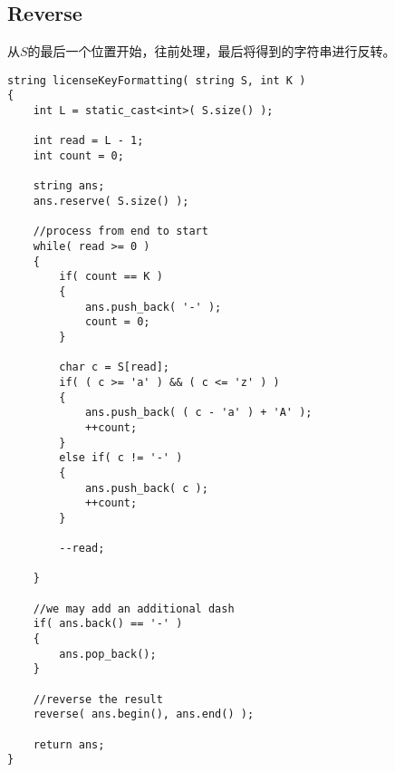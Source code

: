 \subsection{Reverse}
从$S$的最后一个位置开始，往前处理，最后将得到的字符串进行反转。

\setcounter{lstlisting}{0}
\begin{lstlisting}[style=customc, caption={Reverse}]
string licenseKeyFormatting( string S, int K )
{
    int L = static_cast<int>( S.size() );

    int read = L - 1;
    int count = 0;

    string ans;
    ans.reserve( S.size() );

    //process from end to start
    while( read >= 0 )
    {
        if( count == K )
        {
            ans.push_back( '-' );
            count = 0;
        }

        char c = S[read];
        if( ( c >= 'a' ) && ( c <= 'z' ) )
        {
            ans.push_back( ( c - 'a' ) + 'A' );
            ++count;
        }
        else if( c != '-' )
        {
            ans.push_back( c );
            ++count;
        }

        --read;

    }

    //we may add an additional dash
    if( ans.back() == '-' )
    {
        ans.pop_back();
    }

    //reverse the result
    reverse( ans.begin(), ans.end() );

    return ans;
}

\end{lstlisting}